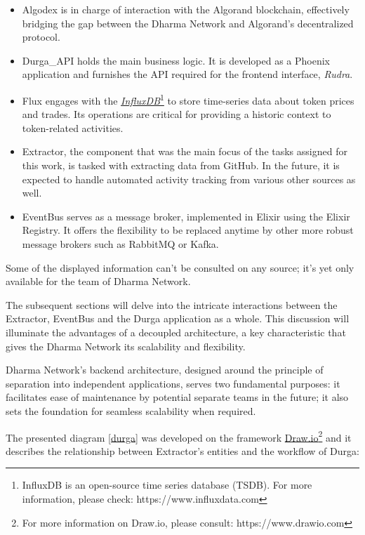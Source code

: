 \begin{itemize}
    \item Algodex is in charge of interaction with the Algorand blockchain, effectively bridging the gap between the Dharma Network and Algorand's decentralized protocol.
    \item Durga\_API holds the main business logic. It is developed as a Phoenix application and furnishes the API required for the frontend interface, \textit{Rudra}.
    \item Flux engages with the \href{https://www.influxdata.com}{\textit{InfluxDB}}\footnote{InfluxDB is an open-source time series database (TSDB). For more information, please check: https://www.influxdata.com} to store time-series data about token prices and trades. Its operations are critical for providing a historic context to token-related activities.
    \item Extractor, the component that was the main focus of the tasks assigned for this work, is tasked with extracting data from GitHub. In the future, it is expected to handle automated activity tracking from various other sources as well.
    \item EventBus serves as a message broker, implemented in Elixir using the Elixir Registry. It offers the flexibility to be replaced anytime by other more robust message brokers such as RabbitMQ or Kafka.
\end{itemize}

Some of the displayed information can't be consulted on any source; it's yet only available for the team of Dharma Network.\newline

The subsequent sections will delve into the intricate interactions between the Extractor, EventBus and the Durga application as a whole. This discussion will illuminate the advantages of a decoupled architecture, a key characteristic that gives the Dharma Network its scalability and flexibility.\newline

Dharma Network's backend architecture, designed around the principle of separation into independent applications, serves two fundamental purposes: it facilitates ease of maintenance by potential separate teams in the future; it also sets the foundation for seamless scalability when required.\newline

The presented diagram \ref{durga} was developed on the framework \href{https://www.drawio.com}{Draw.io}\footnote{For more information on Draw.io, please consult: https://www.drawio.com} and it describes the relationship between Extractor's entities and the workflow of Durga:\newline

